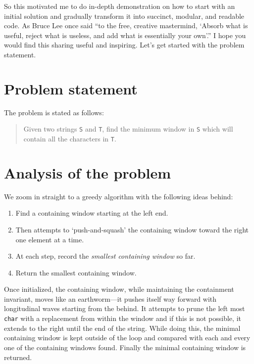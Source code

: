 \documentclass[oneside,11pt]{book}
\theoremstyle{definition}
\theoremstyle{remark}
\newcommand{\code}[1]{\mbox{\lstinline{#1}}}
\begin{document}
So this motivated me to do in-depth demonstration on how to start with an initial solution and
gradually transform it into succinct, modular, and readable code.
As Bruce Lee once said ``to the free, creative mastermind, `Absorb what is useful, reject what is
useless, and add what is essentially your own'.''
I hope you would find this sharing useful and inspiring.
Let's get started with the problem statement.

\section{Problem statement}\label{sec:problemStatement.min-window}

The problem is stated as follows:
\begin{quote}
    Given two strings \code{S} and \code{T}, find the minimum window in \code{S}
    which will contain all the characters in \code{T}.
\end{quote}

\section{Analysis of the problem}\label{sec:analysis.min-window}

We zoom in straight to a greedy algorithm with the following ideas behind:
\begin{alisting}
    \caption{Greedy algorithm for the `minimum window' problem.}
    \begin{enumerate}
        \item Find a containing window starting at the left end.
        \item Then attempts to `push-and-squash' the containing window toward the right one element
        at a time.
        \item At each step, record the \emph{smallest containing window} so far.
        \item Return the smallest containing window.
    \end{enumerate}
\end{alisting}

Once initialized, the containing window, while maintaining the containment invariant, moves like an
earthworm---it pushes itself way forward with longitudinal waves starting from the behind.
It attempts to prune the left most \code{char} with a replacement from within
the window and if this is not possible, it extends to the right until the end
of the string.
While doing this, the minimal containing window is kept outside of the loop and compared with
each and every one of the containing windows found.
Finally the minimal containing window is returned.
\end{document}
